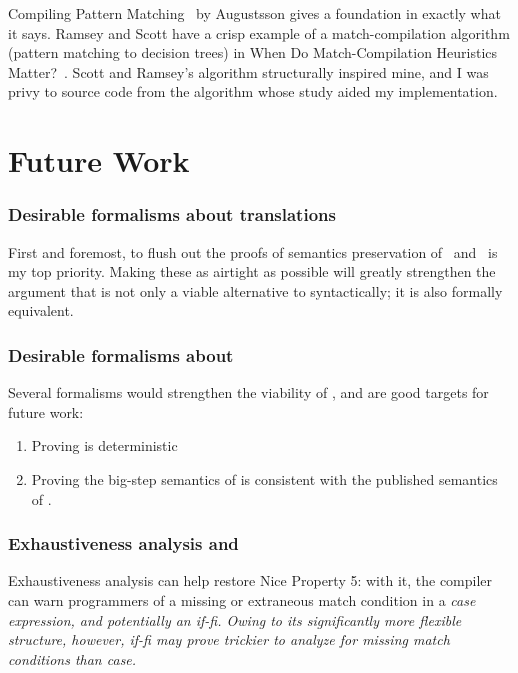 \documentclass[manuscript,screen,review, 12pt, nonacm]{acmart}
\begin{document}
    Compiling Pattern Matching~\citep{augustsson1985compiling} by Augustsson
    gives a foundation in exactly what it says. Ramsey and Scott have a crisp
    example of a match-compilation algorithm (pattern matching to decision
    trees) in When Do Match-Compilation Heuristics Matter?~\citep{scottramsey}.
    Scott and Ramsey's algorithm structurally inspired mine, and I was privy to
    source code from the algorithm whose study aided my implementation. 
    
    \section{Future Work}        
    \label{futurework}

        \subsubsection{Desirable formalisms about translations}
        First and foremost, to flush out the proofs of semantics preservation of
        \PTran\ and \DTran\ is my top priority. Making these as airtight as
        possible will greatly strengthen the argument that \VMinus is not only a
        viable alternative to \PPlus syntactically; it is also formally
        equivalent. 

        \subsubsection{Desirable formalisms about \VMinus}
        Several formalisms would strengthen the viability of \VMinus, and 
        are good targets for future work: 

        \begin{enumerate}
            \item Proving \VMinus is deterministic 
            \item Proving the big-step semantics of \VMinus is consistent with
            the published semantics of \VC.
        \end{enumerate}


        \subsubsection{Exhaustiveness analysis \PPlus and \VMinus}
        \label{typingppandvm}

        Exhaustiveness analysis can help restore Nice Property 5: with it,
        the compiler can warn programmers of a missing or extraneous match
        condition in a \it{case} expression, and potentially an \it{if-fi}.
        Owing to its significantly more flexible structure, however, \it{if-fi}
        may prove trickier to analyze for missing match conditions than
        \it{case}.
\end{document}
